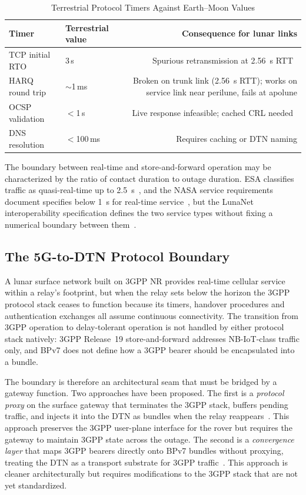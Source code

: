 \documentclass[11pt,a4paper]{article}
\begin{document}
\begin{table}[!t]
\caption{Terrestrial Protocol Timers Against Earth--Moon Values}
\label{tab:timers}
\centering
\footnotesize
\begin{tabularx}{\columnwidth}{@{}llR@{}}
\toprule
Timer & Terrestrial value & Consequence for lunar links \\
\midrule
TCP initial RTO & 3\,s & Spurious retransmission at \SI{2.56}{s} RTT~\cite{wood_tcp_radius} \\
HARQ round trip & $\sim$1\,ms & Broken on trunk link (\SI{2.56}{s} RTT); works on service link near perilune, fails at apolune \\
OCSP validation & $<$1\,s & Live response infeasible; cached CRL needed~\cite{koisser_pki_space} \\
DNS resolution & $<$100\,ms & Requires caching or DTN naming \\
\bottomrule
\end{tabularx}
\end{table}

The boundary between real-time and store-and-forward operation may be characterized by the ratio of contact duration to outage duration. ESA classifies traffic as quasi-real-time up to \SI{2.5}{\second}~\cite{ulierte_traffic_prio}, and the NASA service requirements document specifies below \SI{1}{\second} for real-time service~\cite{nasa_lunar_relay_srd}, but the LunaNet interoperability specification defines the two service types without fixing a numerical boundary between them~\cite{lnis_v5}.

\subsection{The 5G-to-DTN Protocol Boundary}
A lunar surface network built on 3GPP NR provides real-time cellular service within a relay's footprint, but when the relay sets below the horizon the 3GPP protocol stack ceases to function because its timers, handover procedures and authentication exchanges all assume continuous connectivity. The transition from 3GPP operation to delay-tolerant operation is not handled by either protocol stack natively: 3GPP Release~19 store-and-forward addresses NB-IoT-class traffic only, and BPv7 does not define how a 3GPP bearer should be encapsulated into a bundle.

The boundary is therefore an architectural seam that must be bridged by a gateway function. Two approaches have been proposed. The first is a \emph{protocol proxy} on the surface gateway that terminates the 3GPP stack, buffers pending traffic, and injects it into the DTN as bundles when the relay reappears~\cite{nasa_lunar_3gpp_gem}. This approach preserves the 3GPP user-plane interface for the rover but requires the gateway to maintain 3GPP state across the outage. The second is a \emph{convergence layer} that maps 3GPP bearers directly onto BPv7 bundles without proxying, treating the DTN as a transport substrate for 3GPP traffic~\cite{perreault_testbed}. This approach is cleaner architecturally but requires modifications to the 3GPP stack that are not yet standardized.
\end{document}
